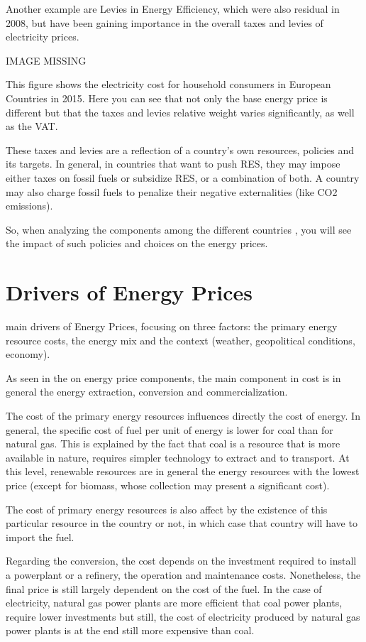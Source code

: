 \documentclass[]{book}
\theoremstyle{definition}
\theoremstyle{definition}
\theoremstyle{definition}
\theoremstyle{remark}
\begin{document}
Another example are Levies in Energy Efficiency, which were also
residual in 2008, but have been gaining importance in the overall taxes
and levies of electricity prices.

IMAGE MISSING

This figure shows the electricity cost for household consumers in
European Countries in 2015. Here you can see that not only the base
energy price is different but that the taxes and levies relative weight
varies significantly, as well as the VAT.

These taxes and levies are a reflection of a country's own resources,
policies and its targets. In general, in countries that want to push
RES, they may impose either taxes on fossil fuels or subsidize RES, or a
combination of both. A country may also charge fossil fuels to penalize
their negative externalities (like CO2 emissions).

So, when analyzing the components among the different countries , you
will see the impact of such policies and choices on the energy prices.

\section{Drivers of Energy Prices}\label{drivers-of-energy-prices}

main drivers of Energy Prices, focusing on three factors: the primary
energy resource costs, the energy mix and the context (weather,
geopolitical conditions, economy).

As seen in the on energy price components, the main component in cost is
in general the energy extraction, conversion and commercialization.

The cost of the primary energy resources influences directly the cost of
energy. In general, the specific cost of fuel per unit of energy is
lower for coal than for natural gas. This is explained by the fact that
coal is a resource that is more available in nature, requires simpler
technology to extract and to transport. At this level, renewable
resources are in general the energy resources with the lowest price
(except for biomass, whose collection may present a significant cost).

The cost of primary energy resources is also affect by the existence of
this particular resource in the country or not, in which case that
country will have to import the fuel.

Regarding the conversion, the cost depends on the investment required to
install a powerplant or a refinery, the operation and maintenance costs.
Nonetheless, the final price is still largely dependent on the cost of
the fuel. In the case of electricity, natural gas power plants are more
efficient that coal power plants, require lower investments but still,
the cost of electricity produced by natural gas power plants is at the
end still more expensive than coal.
\end{document}
